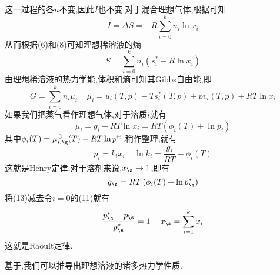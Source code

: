 \documentclass{ctexart}
\begin{document}
\begin{derivation}
    这一过程的各$n$不变,因此$I$也不变.对于混合理想气体,根据可知
    \begin{equation}
        I=\Delta S=-R\sum_{i=0}^{k}n_i\ln x_i
    \end{equation}
    从而根据(6)和(8)可知理想稀溶液的熵
    \begin{equation}
        S=\sum_{i=0}^{k}n_i\left(s_i^\ast-R\ln x_i\right)
    \end{equation}
    由理想稀溶液的热力学能,体积和熵可知其Gibbs自由能,即
    \begin{equation}
        G=\sum_{i=0}^{k}n_i\mu_i\ \ \ \ \ \mu_i=u_i(T,p)-Ts_i^\ast(T,p)+pv_i(T,p)+RT\ln x_i
    \end{equation}
    如果我们把蒸气看作理想气体,对于溶质$i$就有
    \begin{equation}
        \mu_i=g_i+RT\ln x_i=RT\left(\phi_i(T)+\ln p_i\right)
    \end{equation}
    其中$\phi_i(T)=\mu_{i,\g}^{\ominus}(T)-RT\ln p^\ominus$.稍作整理,就有
    \begin{equation}
        p_i=k_ix_i\ \ \ \ \ \ln k_i=\dfrac{g_i}{RT}-\phi_i(T)
    \end{equation}
    这就是Henry定律.对于溶剂来说,$x_\s\to1$,即有
    \begin{equation}
        g_\s=RT\left(\phi_i(T)+\ln p_\s^\ast\right)
    \end{equation}
    将(13)减去令$i=0$的(11)就有
    \begin{equation}
        \dfrac{p_\s^\ast-p_\s}{p_\s^\ast}=1-x_\s=\sum_{i=1}^{k}x_i
    \end{equation}
    这就是Raoult定律.

\end{derivation}
\vspace{8pt}
\indent 基于,我们可以推导出理想溶液的诸多热力学性质.
\end{document}
